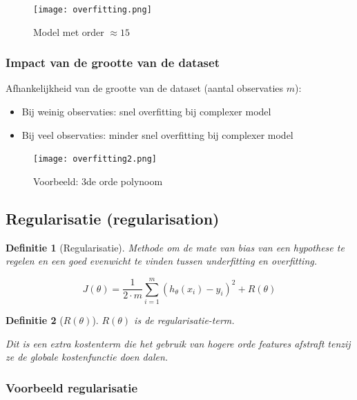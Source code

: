 \documentclass{article}
\newtheorem{theorem}{Definitie}[section]
\begin{document}
\begin{figure}[H]
    \centering
    \texttt{[image: overfitting.png]}
    \caption{Model met order $\approx 15$}
\end{figure}

\subsubsection{Impact van de grootte van de dataset}

Afhankelijkheid van de grootte van de dataset (aantal observaties $m$):

\begin{itemize}
    \item Bij weinig observaties: snel overfitting bij complexer model
    \item Bij veel observaties: minder snel overfitting bij complexer model
\end{itemize}

\begin{figure}[H]
    \centering
    \texttt{[image: overfitting2.png]}
    \caption{Voorbeeld: 3de orde polynoom}
\end{figure}

\subsection{Regularisatie (regularisation)}

\begin{theorem}[Regularisatie]
Methode om de mate van bias van een hypothese te regelen en een 
goed evenwicht te vinden tussen underfitting en overfitting.

\begin{equation}
J(\theta) = \frac{1}{2\cdot m} \sum_{i=1}^m (h_{\theta}(x_i) - y_i)^2 + R(\theta)
\end{equation}


\end{theorem}

\begin{theorem}[$R(\theta)$]
$R(\theta)$ is de regularisatie-term. 

Dit is een extra kostenterm die het gebruik van hogere orde features afstraft
tenzij ze de globale kostenfunctie doen dalen.
\end{theorem}

\subsubsection{Voorbeeld regularisatie}
\end{document}
